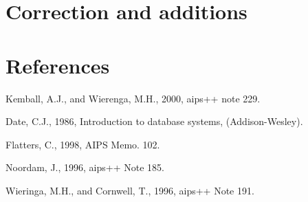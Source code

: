 \documentclass{article}
\begin{document}
\section{Correction and additions}

\section{References}

\noindent Kemball, A.J., and Wierenga, M.H., 2000, aips++ note 229.

\noindent Date, C.J., 1986, Introduction to database systems, (Addison-Wesley).

\noindent Flatters, C., 1998, AIPS Memo. 102.

\noindent Noordam, J., 1996, aips++ Note 185.

\noindent Wieringa, M.H., and Cornwell, T., 1996, aips++ Note 191.
\end{document}
